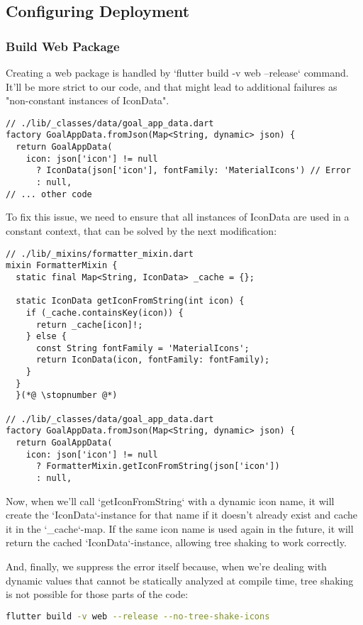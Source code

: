 
\subsection{Configuring Deployment}


\subsubsection{Build Web Package}

Creating a web package is handled by `flutter build -v web --release` command. It'll be more strict to our code, and 
that might lead to additional failures as "non-constant instances of IconData".

\begin{lstlisting}
// ./lib/_classes/data/goal_app_data.dart
factory GoalAppData.fromJson(Map<String, dynamic> json) {
  return GoalAppData(
    icon: json['icon'] != null
      ? IconData(json['icon'], fontFamily: 'MaterialIcons') // Error
      : null,
// ... other code
\end{lstlisting}

\noindent To fix this issue, we need to ensure that all instances of IconData are used in a constant context, that can 
be solved by the next modification:
\begin{lstlisting}
// ./lib/_mixins/formatter_mixin.dart
mixin FormatterMixin {
  static final Map<String, IconData> _cache = {};

  static IconData getIconFromString(int icon) {
    if (_cache.containsKey(icon)) {
      return _cache[icon]!;
    } else {
      const String fontFamily = 'MaterialIcons';
      return IconData(icon, fontFamily: fontFamily);
    }
  }
  }(*@ \stopnumber @*)

// ./lib/_classes/data/goal_app_data.dart
factory GoalAppData.fromJson(Map<String, dynamic> json) {
  return GoalAppData(
    icon: json['icon'] != null
      ? FormatterMixin.getIconFromString(json['icon'])
      : null,
\end{lstlisting}

Now, when we'll call `getIconFromString` with a dynamic icon name, it will create the `IconData`-instance for that name 
if it doesn't already exist and cache it in the `\_cache`-map. If the same icon name is used again in the future, 
it will return the cached `IconData`-instance, allowing tree shaking to work correctly.

And, finally, we suppress the error itself because, when we're dealing with dynamic values that cannot be statically 
analyzed at compile time, tree shaking is not possible for those parts of the code:

\begin{lstlisting}[language=bash]
flutter build -v web --release --no-tree-shake-icons
\end{lstlisting}
